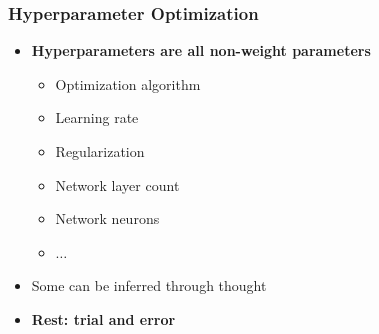 \documentclass[aspectratio=169]{beamer}
\begin{document}
\begin{frame}
\frametitle{Hyperparameter Optimization}

\begin{itemize}
    \item \textbf{Hyperparameters are all non-weight parameters}
    \begin{itemize}
        \item Optimization algorithm
        \item Learning rate
        \item Regularization
        \item Network layer count
        \item Network neurons
        \item $\dots$
    \end{itemize}
    \item Some can be inferred through thought
    \item \textbf{Rest: trial and error}
\end{itemize}
\end{frame}
\end{document}
